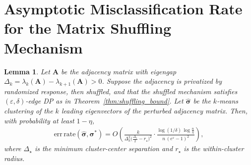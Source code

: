 \documentclass[11pt]{article}
\theoremstyle{plain}
\newtheorem{lemma}{Lemma}[section]
\theoremstyle{definition}
\theoremstyle{remark}
\begin{document}




\section{Asymptotic Misclassification Rate for the Matrix Shuffling Mechanism}
\label{appendix:asym_analysis}



\begin{lemma}
\label{lem:asymptotic_shuffling}
Let $\mathbf{A}$ be the adjacency matrix with eigengap 
$\Delta_k=\lambda_{k}(\mathbf{A})-\lambda_{k+1}(\mathbf{A})>0$. 
Suppose the adjacency is privatized by randomized response, then shuffled, and that the shuffled mechanism 
satisfies $(\varepsilon,\delta)$-edge DP as in Theorem~\ref{thm:shuffling_bound}. 
Let $\hat{\bm{\sigma}}$ be the $k$-means clustering of the $k$ leading eigenvectors of the perturbed adjacency matrix. 
Then, with probability at least $1-\eta$,
\begin{equation*}
\begin{aligned}
\mathrm{err\,rate}(\hat{\bm{\sigma}},\bm{\sigma}^\ast) 
=  O\!\left(
\frac{k}{\Delta_k^2\bigl(\tfrac{\Delta_\star}{2}-r_\star\bigr)^2}
\cdot
\frac{\log(1/\delta)\,\log\!\tfrac{n}{\eta}}{n\,(e^{\varepsilon}-1)^2}
\right),
\end{aligned}
\end{equation*}
where $\Delta_\star$ is the minimum cluster-center separation and $r_\star$ is the within-cluster radius. 
\end{lemma}
\end{document}
